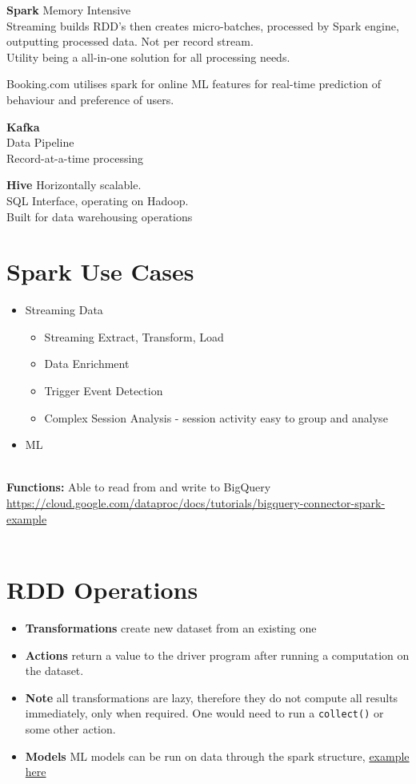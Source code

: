 \documentclass[english]{article}
\begin{document}
\textbf{Spark}
Memory Intensive \\
Streaming builds RDD's then creates micro-batches, processed by Spark engine, outputting processed data. Not per record stream. \\
Utility being a all-in-one solution for all processing needs.

Booking.com utilises spark for online ML features for real-time prediction of behaviour and preference of users.

\textbf{Kafka} \\
Data Pipeline \\
Record-at-a-time processing

\textbf{Hive}
Horizontally scalable. \\
SQL Interface, operating on Hadoop. \\
Built for data warehousing operations \\



\section{Spark Use Cases}
\begin{itemize}
\item Streaming Data
	\begin{itemize}
		\item Streaming Extract, Transform, Load
		\item Data Enrichment
		\item Trigger Event Detection
		\item Complex Session Analysis - session activity easy to group and analyse
	\end{itemize}
\item ML
\end{itemize}
\\
\textbf{Functions:}
Able to read from and write to BigQuery \href{example here}{https://cloud.google.com/dataproc/docs/tutorials/bigquery-connector-spark-example}
\\\\


\section{RDD Operations}
\begin{itemize}
\item \textbf{Transformations } create new dataset from an existing one
\item \textbf{Actions } return a value to the driver program after running a computation on the dataset.
\item \textbf{Note } all transformations are lazy, therefore they do not compute all results immediately, only when required. One would need to run a \verb"collect()" or some other action.
\item \textbf{Models } ML models can be run on data through the spark structure, \href{https://github.com/apache/spark/blob/master/examples/src/main/python/kmeans.py}{example here}
\end{itemize}
\end{document}
